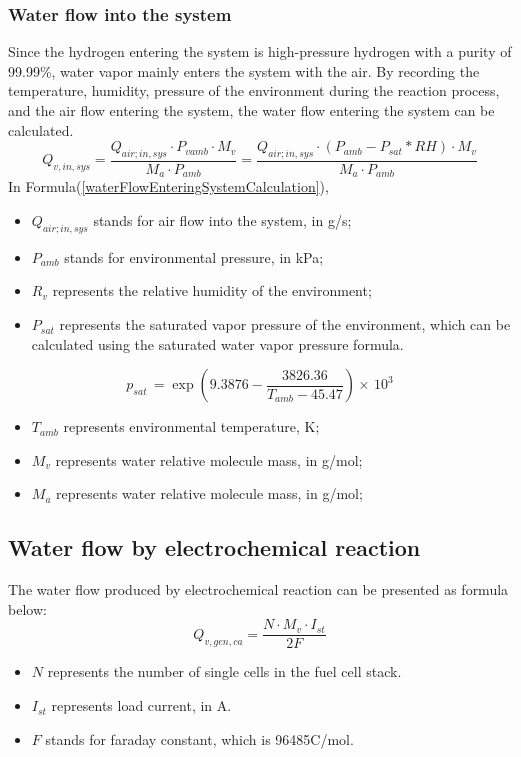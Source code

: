 \subsubsection{Water flow into the system}
Since the hydrogen entering the system is high-pressure hydrogen with a purity of 99.99\%, water vapor mainly enters the system with the air. By recording the temperature, humidity, pressure of the environment during the reaction process, and the air flow entering the system, the water flow entering the system can be calculated.
\begin{equation}\label{waterFlowEnteringSystemCalculation}
	Q_{v,i n,s y s}={\frac{Q_{a i r;i n,s y s}\cdot P_{v a m b} \cdot M_{v}}{M_{a} \cdot P_{a m b}}}={\frac{Q_{a i r;i n,s y s}\cdot (P_{a m b} - P_{s a t} \ast RH)\cdot M_{v}}{M_{a} \cdot P_{a m b}}}
\end{equation}
In Formula(\ref{waterFlowEnteringSystemCalculation}),
\begin{itemize}
	\item $Q_{a i r;i n,s y s}$ stands for air flow into the system, in g/s;
	\item $P_{a m b}$ stands for environmental pressure, in kPa;
	\item $R_{v}$ represents the relative humidity of the environment;
	\item $P_{sat}$ represents the saturated vapor pressure of the environment, which can be calculated using the saturated water vapor pressure formula.
\end{itemize}

\begin{equation}
	p_{sat}\,= \exp \left(9.3876-{\frac{3826.36}{T_{a m b}-45.47}}\right)\times\,10^{3}
\end{equation}
\begin{itemize}
	\item $T_{amb}$ represents environmental temperature, K;
	\item $M_{v}$ represents water relative molecule mass, in g/mol;
	\item $M_{a}$ represents water relative molecule mass, in g/mol;
\end{itemize}
\subsection*{Water flow by electrochemical reaction}
The water flow produced by electrochemical reaction can be presented as formula below:
\begin{equation}
	Q_{v,g e n,c a}=\frac{{N\cdot M_{v}\cdot I_{s t}}}{2F}
\end{equation}
\begin{itemize}
	\item $N$ represents the number of single cells in the fuel cell stack.
	\item $I_{st}$ represents load current, in A.
	\item $F$ stands for faraday constant, which is 96485C/mol.
\end{itemize}
